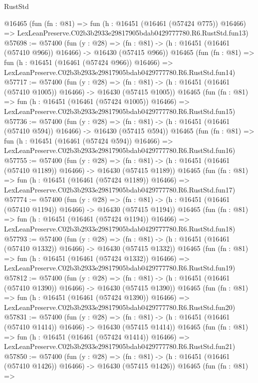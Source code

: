 \begin{lexlean}{RustStd}
\begin{coremodule}
    @16465
    (fun (fn : @81) =>
    fun (h : @16451 (@16461 (@57424 @775)) @16466) =>
    LexLeanPreserve.C02b3b2933e29817905bdab0429777780.R6.RustStd.fun13)
@57698 := @57400
    (fun (y : @28) =>
    (fn : @81) -> (h : @16451 (@16461 (@57410 @966)) @16466) -> @16430 (@57415 @966))
    @16465
    (fun (fn : @81) =>
    fun (h : @16451 (@16461 (@57424 @966)) @16466) =>
    LexLeanPreserve.C02b3b2933e29817905bdab0429777780.R6.RustStd.fun14)
@57717 := @57400
    (fun (y : @28) =>
    (fn : @81) -> (h : @16451 (@16461 (@57410 @1005)) @16466) -> @16430 (@57415 @1005))
    @16465
    (fun (fn : @81) =>
    fun (h : @16451 (@16461 (@57424 @1005)) @16466) =>
    LexLeanPreserve.C02b3b2933e29817905bdab0429777780.R6.RustStd.fun15)
@57736 := @57400
    (fun (y : @28) =>
    (fn : @81) -> (h : @16451 (@16461 (@57410 @594)) @16466) -> @16430 (@57415 @594))
    @16465
    (fun (fn : @81) =>
    fun (h : @16451 (@16461 (@57424 @594)) @16466) =>
    LexLeanPreserve.C02b3b2933e29817905bdab0429777780.R6.RustStd.fun16)
@57755 := @57400
    (fun (y : @28) =>
    (fn : @81) -> (h : @16451 (@16461 (@57410 @1189)) @16466) -> @16430 (@57415 @1189))
    @16465
    (fun (fn : @81) =>
    fun (h : @16451 (@16461 (@57424 @1189)) @16466) =>
    LexLeanPreserve.C02b3b2933e29817905bdab0429777780.R6.RustStd.fun17)
@57774 := @57400
    (fun (y : @28) =>
    (fn : @81) -> (h : @16451 (@16461 (@57410 @1194)) @16466) -> @16430 (@57415 @1194))
    @16465
    (fun (fn : @81) =>
    fun (h : @16451 (@16461 (@57424 @1194)) @16466) =>
    LexLeanPreserve.C02b3b2933e29817905bdab0429777780.R6.RustStd.fun18)
@57793 := @57400
    (fun (y : @28) =>
    (fn : @81) -> (h : @16451 (@16461 (@57410 @1332)) @16466) -> @16430 (@57415 @1332))
    @16465
    (fun (fn : @81) =>
    fun (h : @16451 (@16461 (@57424 @1332)) @16466) =>
    LexLeanPreserve.C02b3b2933e29817905bdab0429777780.R6.RustStd.fun19)
@57812 := @57400
    (fun (y : @28) =>
    (fn : @81) -> (h : @16451 (@16461 (@57410 @1390)) @16466) -> @16430 (@57415 @1390))
    @16465
    (fun (fn : @81) =>
    fun (h : @16451 (@16461 (@57424 @1390)) @16466) =>
    LexLeanPreserve.C02b3b2933e29817905bdab0429777780.R6.RustStd.fun20)
@57831 := @57400
    (fun (y : @28) =>
    (fn : @81) -> (h : @16451 (@16461 (@57410 @1414)) @16466) -> @16430 (@57415 @1414))
    @16465
    (fun (fn : @81) =>
    fun (h : @16451 (@16461 (@57424 @1414)) @16466) =>
    LexLeanPreserve.C02b3b2933e29817905bdab0429777780.R6.RustStd.fun21)
@57850 := @57400
    (fun (y : @28) =>
    (fn : @81) -> (h : @16451 (@16461 (@57410 @1426)) @16466) -> @16430 (@57415 @1426))
    @16465
    (fun (fn : @81) =>

\end{coremodule}
\end{lexlean}
